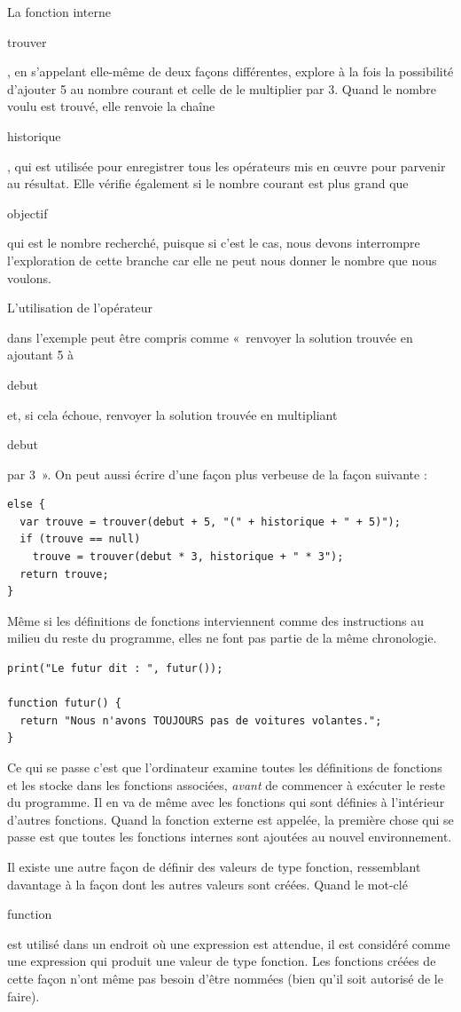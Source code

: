 \documentclass{FramateX}
\renewcommand{\texttt}[1]{\begin{sffamily}{#1}\end{sffamily}}
\begin{document}
La fonction interne \texttt{trouver}, en s'appelant elle-même de deux
façons différentes, explore à la fois la possibilité d'ajouter 5 au
nombre courant et celle de le multiplier par 3. Quand le nombre voulu
est trouvé, elle renvoie la chaîne \texttt{historique}, qui est utilisée
pour enregistrer tous les opérateurs mis en œuvre pour parvenir au
résultat. Elle vérifie également si le nombre courant est plus grand que
\texttt{objectif} qui est le nombre recherché, puisque si c'est le cas,
nous devons interrompre l'exploration de cette branche car elle ne peut
nous donner le nombre que nous voulons.

L'utilisation de l'opérateur \texttt{\textbar{}\textbar{}} dans
l'exemple peut être compris comme «~renvoyer la solution trouvée en
ajoutant 5 à \texttt{debut} et, si cela échoue, renvoyer la solution
trouvée en multipliant \texttt{debut} par 3~». On peut aussi écrire
d'une façon plus verbeuse de la façon suivante :

\begin{lstlisting}
else {
  var trouve = trouver(debut + 5, "(" + historique + " + 5)");
  if (trouve == null)
    trouve = trouver(debut * 3, historique + " * 3");
  return trouve;
}
\end{lstlisting}
\begin{center}\end{center}

Même si les définitions de fonctions interviennent comme des
instructions au milieu du reste du programme, elles ne font pas partie
de la même chronologie.

\begin{lstlisting}
print("Le futur dit : ", futur());

function futur() {
  return "Nous n'avons TOUJOURS pas de voitures volantes.";
}
\end{lstlisting}
Ce qui se passe c'est que l'ordinateur examine toutes les définitions de
fonctions et les stocke dans les fonctions associées, \emph{avant} de
commencer à exécuter le reste du programme. Il en va de même avec les
fonctions qui sont définies à l'intérieur d'autres fonctions. Quand la
fonction externe est appelée, la première chose qui se passe est que
toutes les fonctions internes sont ajoutées au nouvel environnement.

\begin{center}\end{center}

Il existe une autre façon de définir des valeurs de type fonction,
ressemblant davantage à la façon dont les autres valeurs sont créées.
Quand le mot-clé \texttt{function} est utilisé dans un endroit où une
expression est attendue, il est considéré comme une expression qui
produit une valeur de type fonction. Les fonctions créées de cette façon
n'ont même pas besoin d'être nommées (bien qu'il soit autorisé de le
faire).
\end{document}
